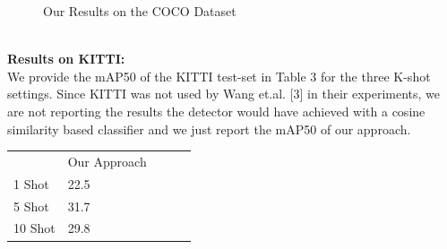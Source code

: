 \documentclass{article}
\begin{document}
\begin{figure}[h!]
\begin{minipage}{0.47\textwidth}
  \label{10 Shot}
  \end{minipage}
  \caption{Our Results on the COCO Dataset }
  \label{finetuning}
\end{figure}\\
\textbf{Results on KITTI:}\\
We provide the mAP50 of the KITTI test-set in Table 3 for the three K-shot settings. Since KITTI was not used by Wang et.al. [3] in their experiments, we are not reporting the results the detector would have achieved with a cosine similarity based classifier and we just report the mAP50 of our approach. 
\begin{table}[h!]
\begin{tabular}{lllll}
        & Our Approach &  &  &  \\
1 Shot  & 22.5         &  &  &  \\
5 Shot  & 31.7         &  &  &  \\
10 Shot & 29.8         &  &  & 
\end{tabular}
\end{table}\\
\end{document}
